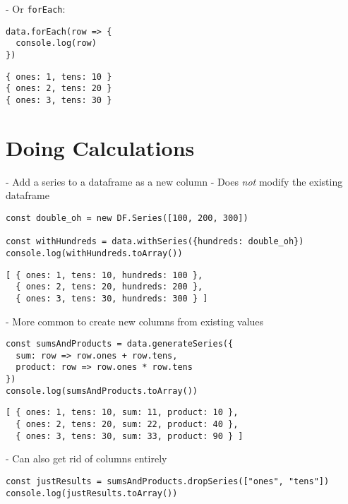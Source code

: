 -   Or \texttt{forEach}:

\begin{verbatim}
data.forEach(row => {
  console.log(row)
})
\end{verbatim}

\begin{verbatim}
{ ones: 1, tens: 10 }
{ ones: 2, tens: 20 }
{ ones: 3, tens: 30 }
\end{verbatim}

\section{Doing Calculations}\label{s:dataforge-calc}

-   Add a series to a dataframe as a new column
    -   Does \emph{not} modify the existing dataframe

\begin{verbatim}
const double_oh = new DF.Series([100, 200, 300])

const withHundreds = data.withSeries({hundreds: double_oh})
console.log(withHundreds.toArray())
\end{verbatim}

\begin{verbatim}
[ { ones: 1, tens: 10, hundreds: 100 },
  { ones: 2, tens: 20, hundreds: 200 },
  { ones: 3, tens: 30, hundreds: 300 } ]
\end{verbatim}


-   More common to create new columns from existing values

\begin{verbatim}
const sumsAndProducts = data.generateSeries({
  sum: row => row.ones + row.tens,
  product: row => row.ones * row.tens
})
console.log(sumsAndProducts.toArray())
\end{verbatim}

\begin{verbatim}
[ { ones: 1, tens: 10, sum: 11, product: 10 },
  { ones: 2, tens: 20, sum: 22, product: 40 },
  { ones: 3, tens: 30, sum: 33, product: 90 } ]
\end{verbatim}

-   Can also get rid of columns entirely

\begin{verbatim}
const justResults = sumsAndProducts.dropSeries(["ones", "tens"])
console.log(justResults.toArray())
\end{verbatim}

